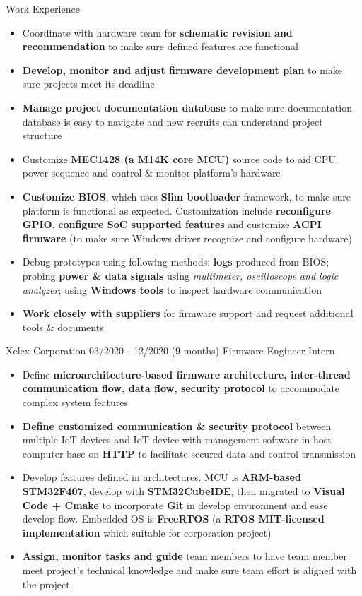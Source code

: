 \documentclass{resume} %
\begin{document}
\begin{rSection}{Work Experience}
\begin{rCompanySubsection}
\begin{itemize}
     \item Coordinate with hardware team for \textbf{schematic revision and recommendation} to make sure defined features are functional
     \item \textbf{Develop, monitor and adjust firmware development plan} to make sure projects meet its deadline
     \item \textbf{Manage project documentation database} to make sure documentation database is easy to navigate and new recruits can understand project structure
     \item Customize \textbf{MEC1428 (a M14K core MCU)} source code to aid CPU power sequence and control \& monitor platform's hardware
     \item \textbf{Customize BIOS}, which uses {\bf Slim bootloader} framework, to make sure platform is functional as expected. Customization include \textbf{reconfigure GPIO}, \textbf{configure SoC supported features} and customize \textbf{ACPI firmware} (to make sure Windows driver recognize and configure hardware)
     \item Debug prototypes using following methods: \textbf{logs} produced from BIOS; probing \textbf{power \& data signals} using \textit{multimeter, oscilloscope and logic analyzer}; using \textbf{Windows tools} to inspect hardware communication
     \item \textbf{Work closely with suppliers} for firmware support and request additional tools \& documents

\end{itemize}
\end{rCompanySubsection}

\begin{rCompanySubsection}
    {Xelex Corporation}
    {03/2020 - 12/2020 (9 months)}
    {Firmware Engineer Intern}
    {}
\begin{itemize}
     \item Define {\bf microarchitecture-based firmware architecture, inter-thread communication flow, data flow, security protocol} to accommodate complex system features
     \item \textbf{Define customized communication \& security protocol} between multiple IoT devices and IoT device with management software in host computer base on \textbf{HTTP} to facilitate secured data-and-control transmission
     \item Develop features defined in architectures. MCU is {\bf ARM-based STM32F407}, develop with {\bf STM32CubeIDE}, then migrated to {\bf Visual Code + Cmake} to incorporate {\bf Git} in develop environment and ease develop flow. Embedded OS is {\bf FreeRTOS} (a  {\bf RTOS MIT-licensed implementation} which suitable for corporation project)
     \item {\bf Assign, monitor tasks and guide} team members to have team member meet project's technical knowledge and make sure team effort is aligned with the project.


\end{itemize}
\end{rCompanySubsection}
\end{rSection}
\end{document}
